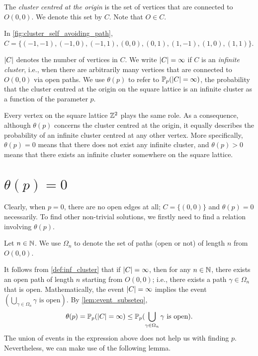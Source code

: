 \documentclass[a4paper, 12pt]{article}
\begin{document}
\begin{defn}\label{def:cluster}
    The \textit{cluster centred at the origin} is the set of vertices that are connected to $O(0, 0)$. We denote this set by $C$. Note that $O \in C$.
\end{defn}
\begin{ex*}
    In \cref{fig:cluster_self_avoiding_path}, $C = \{(-1, -1), (-1, 0), (-1, 1), (0, 0), (0, 1), (1, -1), (1, 0), (1, 1)\}$.
\end{ex*}

\begin{defn}\label{def:inf_cluster}
    $\lvert C \rvert$ denotes the number of vertices in $C$. We write $\lvert C \rvert = \infty$ if $C$ is an \textit{infinite cluster}, i.e., when there are arbitrarily many vertices that are connected to $O(0, 0)$ via open paths. We use $\theta(p)$ to refer to $\mathbb{P}_p(\lvert C \rvert = \infty)$, the probability that the cluster centred at the origin on the square lattice is an infinite cluster as a function of the parameter $p$.
\end{defn}

\begin{rem*}
    Every vertex on the square lattice $\mathbb{Z}^2$ plays the same role. As a consequence, although $\theta(p)$ concerns the cluster centred at the origin, it equally describes the probability of an infinite cluster centred at any other vertex. More specifically, $\theta(p) = 0$ means that there does not exist any infinite cluster, and $\theta(p) > 0$ means that there exists an infinite cluster somewhere on the square lattice.
\end{rem*}

\section{$\theta(p) = 0$}\label{sec:no_inf}
Clearly, when $p = 0$, there are no open edges at all; $C = \{(0, 0)\}$ and $\theta(p) = 0$ necessarily. To find other non-trivial solutions, we firstly need to find a relation involving $\theta(p)$.

\begin{defn}\label{def:set_paths}
    Let $n \in \mathbb{N}$. We use $\Omega_n$ to denote the set of paths (open or not) of length $n$ from $O(0, 0)$.
\end{defn}

It follows from \cref{def:inf_cluster} that if $\lvert C \rvert = \infty$, then for any $n \in \mathbb{N}$, there exists an open path  of length $n$ starting from $O(0, 0)$; i.e., there exists a path $\gamma \in \Omega_n$ that is open. Mathematically, the event $\lvert C \rvert = \infty$ implies the event $(\bigcup_{\gamma \in \Omega_n} \gamma \text{ is open})$. By \cref{lem:event_subseteq},
\begin{align}\label{eq:theta_p_higher_union}
    \theta(p) = \mathbb{P}_p(\lvert C \rvert = \infty) \leq \mathbb{P}_p(\bigcup_{\gamma \in \Omega_n} \gamma \text{ is open}).
\end{align}
The union of events in the expression above does not help us with finding $p$. Nevertheless, we can make use of the following lemma.
\end{document}
